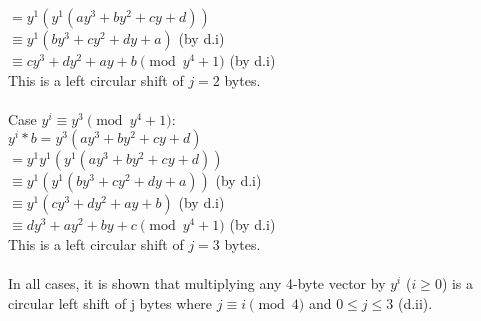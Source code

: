 \documentclass{assignment}
\newcommand\tab[1][0.5cm]{\hspace*{#1}}
\begin{document}
\begin{problemlist}
\begin{problem}
\begin{answer}
\tab$=y^1(y^1(ay^3+by^2+cy+d))$  \\
\tab$\equiv y^1(by^3+cy^2+dy+a)$ \tab (by d.i)\\
\tab$\equiv cy^3+dy^2+ay+b \pmod {y^4+1}$ (by d.i) \\
\tab This is a left circular shift of $j=2$ bytes.\\
\\
Case $y^i\equiv y^3 \pmod {y^4+1}$: \\
\tab$y^i*b=y^3(ay^3+by^2+cy+d)$\\
\tab$=y^1y^1(y^1(ay^3+by^2+cy+d))$  \\
\tab$\equiv y^1(y^1(by^3+cy^2+dy+a))$ \tab (by d.i)\\
\tab$\equiv y^1(cy^3+dy^2+ay+b) $ \tab\tab (by d.i)\\
\tab$\equiv dy^3+ay^2+by+c \pmod {y^4+1}$  (by d.i)\\
\tab This is a left circular shift of $j=3$ bytes.\\
\\
In all cases, it is shown that multiplying any 4-byte vector by $y^i$ ($i\geq 0$) is a circular left shift of j bytes where $j\equiv i \pmod 4$ and $0\leq j \leq 3$ (d.ii).\\
\\
\end{answer}
\end{problem}


\end{problemlist}
\end{document}
